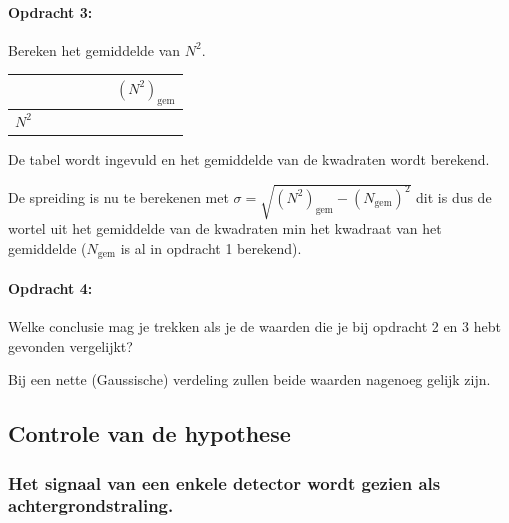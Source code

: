 \begin{minipage}[t]{1\columnwidth}%

\paragraph{Opdracht 3:}

Bereken het gemiddelde van $N^{2}$.

\bigskip{}


\begin{tabular}{|>{\centering}p{2cm}|>{\centering}p{2cm}|>{\centering}p{2cm}|>{\centering}p{2cm}|>{\centering}p{2cm}|>{\centering}p{2cm}|>{\centering}p{2cm}|}
    \cline{2-7} 
    \multicolumn{1}{c|}{} & 1 & 2 & 3 & 4 & 5 & $\left(N^{2}\right)_\textrm{gem}$\tabularnewline
    \hline 
    $N^{2}$ &  &  &  &  &  & \tabularnewline
    \hline 
\end{tabular}

\bigskip{}

De tabel wordt ingevuld en het gemiddelde van de kwadraten wordt berekend.

\bigskip{}

De spreiding is nu te berekenen met
$\sigma=\sqrt{\left(N^{2}\right)_\textrm{gem}-\left(N_\textrm{gem}\right)^{2}}$ dit is
dus de wortel uit het gemiddelde van de kwadraten min het kwadraat van
het gemiddelde ($N_\textrm{gem}$ is al in opdracht 1 berekend).

\end{minipage}

\bigskip{}

\begin{minipage}[t]{1\columnwidth}%

\paragraph{Opdracht 4:}

Welke conclusie mag je trekken als je de waarden die je bij opdracht
2 en 3 hebt gevonden vergelijkt?

\smallskip{}

Bij een nette (Gaussische) verdeling zullen beide waarden nagenoeg
gelijk zijn. %
\end{minipage}


\subsection{Controle van de hypothese}


\subsubsection{Het signaal van een enkele detector wordt gezien als achtergrondstraling.}

